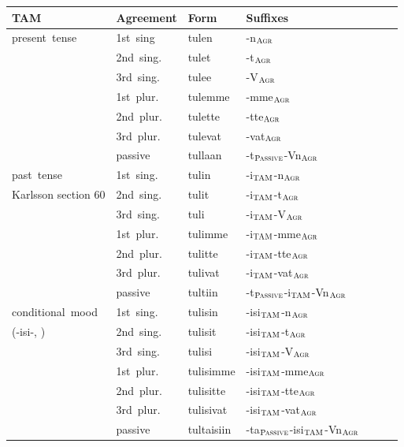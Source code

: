 \documentclass[11pt,letterpaper]{article}
\begin{document}
\begin{table}
\begin{tabular}{l|llllll}
	TAM & Agreement & Form & Suffixes \\ \hline\hline
	present tense & 	1st sing& 	tulen  & -n$_{\textsc{Agr}}$\\ 
	\cite[Section 24]{karlsson1999finnish}	&	2nd sing. 	& 	tulet  & -t$_{\textsc{Agr}}$\\ 
	&	3rd sing. 	& 	tulee  & -V$_{\textsc{Agr}}$\\                
	&	1st plur. 	& 	tulemme  &-mme$_{\textsc{Agr}}$\\ 
	&	2nd plur. 	& 	tulette  &-tte$_{\textsc{Agr}}$\\ 
	&	3rd plur. 	& 	tulevat  &-vat$_{\textsc{Agr}}$\\ 
	&	passive 	& 	tullaan  &-t$_{\textsc{Passive}}$-Vn$_{\textsc{Agr}}$ \\  \hline
past tense 	 	&	1st sing.& 	tulin & -i$_{\textsc{TAM}}$-n$_{\textsc{Agr}}$\\  
	Karlsson section 60&	2nd sing. &	tulit  & -i$_{\textsc{TAM}}$-t$_{\textsc{Agr}}$\\ 
	&	3rd sing. &	tuli  & -i$_{\textsc{TAM}}$-V$_{\textsc{Agr}}$\\ 
	&	1st plur. &	tulimme  &-i$_{\textsc{TAM}}$-mme$_{\textsc{Agr}}$\\ 
	&	2nd plur. &	tulitte  &-i$_{\textsc{TAM}}$-tte$_{\textsc{Agr}}$\\ 
	&3rd plur. &	tulivat  & -i$_{\textsc{TAM}}$-vat$_{\textsc{Agr}}$\\ 
	&	passive &	tultiin  &-t$_{\textsc{Passive}}$-i$_{\textsc{TAM}}$-Vn$_{\textsc{Agr}}$ \\  \hline
conditional mood  &1st sing. &	tulisin  & -isi$_{\textsc{TAM}}$-n$_{\textsc{Agr}}$\\ 
	(-isi-, \cite[Section 65]{karlsson1999finnish})	&2nd sing. &	tulisit  & -isi$_{\textsc{TAM}}$-t$_{\textsc{Agr}}$\\ 
	&3rd sing. &	tulisi  & -isi$_{\textsc{TAM}}$-V$_{\textsc{Agr}}$\\ 
	&1st plur. &	tulisimme  & -isi$_{\textsc{TAM}}$-mme$_{\textsc{Agr}}$\\ 
	&2nd plur. &	tulisitte  & -isi$_{\textsc{TAM}}$-tte$_{\textsc{Agr}}$\\ 
	&3rd plur. &	tulisivat  & -isi$_{\textsc{TAM}}$-vat$_{\textsc{Agr}}$ \\ 
	&passive &	tultaisiin  & -ta$_{\textsc{Passive}}$-isi$_{\textsc{TAM}}$-Vn$_{\textsc{Agr}}$\\  \hline

\end{tabular}
\end{table}
\end{document}
